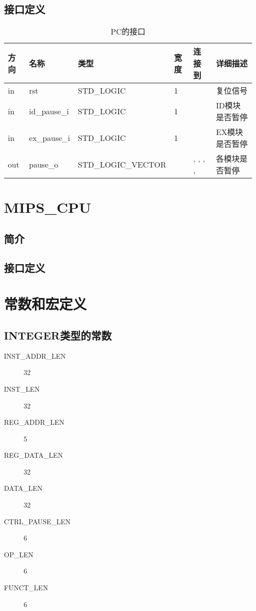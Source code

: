 \documentclass{article}
\begin{document}
\subsection{接口定义}

\begin{table}
    \centering
    \begin{tabular}{llllp{2cm}p{2cm}}
    \toprule
    方向 & 名称 & 类型 & 宽度 & 连接到 & 详细描述 \\ \midrule
    in & rst\label{PAUSE_CTRL:rst} & STD_LOGIC & 1 & \nameref{sec:MIPS_CPU} & 复位信号 \\
    in & id_pause_i\label{PAUSE_CTRL:id_pause_i} & STD_LOGIC & 1 & \nameref{sec:ID} & ID模块是否暂停 \\
    in & ex_pause_i\label{PAUSE_CTRL:ex_pause_i} & STD_LOGIC & 1 & \nameref{sec:EX} & EX模块是否暂停 \\
    out & pause_o\label{PAUSE_CTRL:pause_o} & STD_LOGIC_VECTOR & \nameref{const:CTRL_PAUSE_LEN} & \nameref{sec:PC}, \nameref{sec:IF/ID}, \nameref{sec:ID/EX}, \nameref{sec:EX/MEM}, \nameref{sec:MEM/WB} & 各模块是否暂停 \\
    \bottomrule
    \end{tabular}
    \caption {PC的接口}
\end{table}
\FloatBarrier

\section{MIPS_CPU}
\label{sec:MIPS_CPU}

\subsection{简介}

\subsection{接口定义}

\appendix
\section{常数和宏定义}

\subsection{INTEGER类型的常数}

\begin{description}
  \item[INST_ADDR_LEN\label{const:INST_ADDR_LEN}] 32
  \item[INST_LEN\label{const:INST_LEN}] 32
  \item[REG_ADDR_LEN\label{const:REG_ADDR_LEN}] 5
  \item[REG_DATA_LEN\label{const:REG_DATA_LEN}] 32
  \item[DATA_LEN\label{const:DATA_LEN}] 32
  \item[CTRL_PAUSE_LEN\label{const:CTRL_PAUSE_LEN}] 6
  \item[OP_LEN\label{const:OP_LEN}] 6
  \item[FUNCT_LEN\label{const:FUNCT_LEN}] 6
\end{description}
\end{document}
